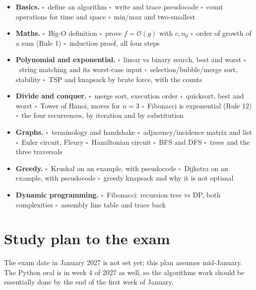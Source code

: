 \documentclass{fkt-notes}
\newif\ifpublic
\newcommand{\priv}[2]{\ifpublic#2\else#1\fi}
\newcommand{\Oh}{\mathcal{O}}
\newcommand{\cb}{$\square$\ }
\begin{document}
\begin{itemize}[leftmargin=1.5em,itemsep=2pt,label={}]
  \item \textbf{Basics.} \cb define an algorithm \quad \cb write and trace pseudocode \quad \cb count operations for time and space \quad \cb min/max and two-smallest
  \item \textbf{Maths.} \cb Big-O definition \quad \cb prove $f=\Oh(g)$ with $c,n_0$ \quad \cb order of growth of a sum (Rule 1) \quad \cb induction proof, all four steps
  \item \textbf{Polynomial and exponential.} \cb linear vs binary search, best and worst \quad \cb string matching and its worst-case input \quad \cb selection/bubble/merge sort, stability \quad \cb TSP and knapsack by brute force, with the counts
  \item \textbf{Divide and conquer.} \cb merge sort, execution order \quad \cb quicksort, best and worst \quad \cb Tower of Hanoi, moves for $n=3$ \quad \cb Fibonacci is exponential (Rule 12) \quad \cb the four recurrences, by iteration and by substitution
  \item \textbf{Graphs.} \cb terminology and handshake \quad \cb adjacency/incidence matrix and list \quad \cb Euler circuit, Fleury \quad \cb Hamiltonian circuit \quad \cb BFS and DFS \quad \cb trees and the three traversals
  \item \textbf{Greedy.} \cb Kruskal on an example, with pseudocode \quad \cb Dijkstra on an example, with pseudocode \quad \cb greedy knapsack and why it is not optimal
  \item \textbf{Dynamic programming.} \cb Fibonacci: recursion tree vs DP, both complexities \quad \cb assembly line table and trace back
\end{itemize}

\section{Study plan to the exam}

The exam date in January 2027 is not set yet; this plan assumes mid-January.\priv{ The Python oral is in week 4 of 2027 as well, so the algorithms work should be essentially done by the end of the first week of January.}{}
\end{document}
